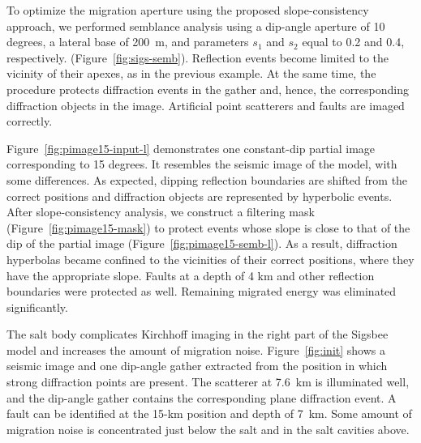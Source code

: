 To optimize the migration aperture using the proposed slope-consistency approach, we performed semblance analysis using a dip-angle
aperture of 10 degrees, a lateral base of 200~m, and parameters $s_1$ and $s_2$ equal to 0.2 and 0.4, respectively.
(Figure~\ref{fig:sigs-semb}). Reflection events become limited to the vicinity of their apexes, as in the
previous example. At the same time, the procedure protects diffraction events in the gather and, hence, the corresponding 
diffraction objects in the image. Artificial point scatterers and faults are imaged correctly.

Figure~\ref{fig:pimage15-input-l}
demonstrates one constant-dip partial image corresponding to 15 degrees. It resembles the seismic
image of the model, with some differences. As expected, dipping reflection boundaries are shifted from the correct positions and diffraction objects
are represented by hyperbolic events. After slope-consistency analysis, we construct a filtering mask (Figure~\ref{fig:pimage15-mask})
to protect events whose slope is close to that of the dip of the partial image (Figure~\ref{fig:pimage15-semb-l}).
As a result, diffraction hyperbolas became confined to the vicinities of their correct positions, where they have
the appropriate slope. Faults at a depth of 4 km and other reflection boundaries were protected as well. Remaining migrated energy was eliminated 
significantly.



The salt body complicates Kirchhoff imaging in the right part of the Sigsbee model and increases the amount of migration noise.
Figure~\ref{fig:init} shows a seismic image and one dip-angle gather extracted from the position in which strong
diffraction points are present. The scatterer at 7.6~km is illuminated well, and the dip-angle gather contains the corresponding plane
diffraction event. A fault can be identified at the 15-km position and depth of 7~km. Some amount of migration noise is concentrated just
below the salt and in the salt cavities above.

